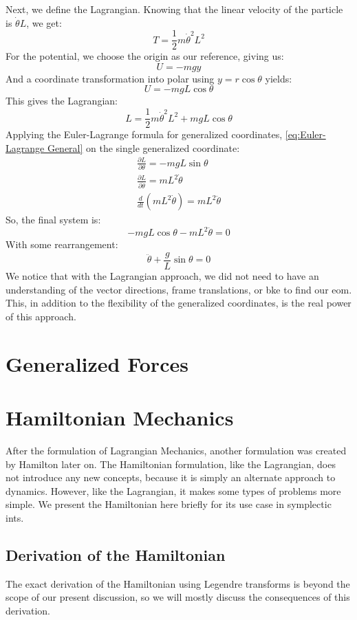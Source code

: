 \documentclass[12pt]{report}
\begin{document}
Next, we define the \gls{Lagrangian}. Knowing that the linear velocity of the particle is $\dot{\theta}L$, we get:
$$T=\frac{1}{2}m\dot{\theta}^2L^2$$
For the potential, we choose the origin as our reference, giving us:
$$U=-mgy$$
And a coordinate transformation into polar using $y=r\cos\theta$ yields:
$$U=-mgL\cos\theta$$
This gives the \gls{Lagrangian}:
$$L=\frac{1}{2}m\dot{\theta}^2L^2+mgL\cos\theta$$
Applying the Euler-Lagrange formula for generalized coordinates, \eqref{eq:Euler-Lagrange General} on the single generalized coordinate:
\begin{gather}
    \frac{\partial L}{\partial \theta}=-mgL\sin\theta\\
    \frac{\partial L}{\partial \dot{\theta}}=mL^2\dot{\theta}\\
    \frac{d}{dt}\left(mL^2\dot{\theta}\right)=mL^2\ddot{\theta}
\end{gather}
So, the final system is:
$$-mgL\cos\theta -mL^2\ddot{\theta}=0$$
With some rearrangement:
$$\ddot{\theta}+\frac{g}{L}\sin\theta=0$$
We notice that with the \gls{Lagrangian} approach, we did not need to have an understanding of the vector directions, frame translations, or \gls{bke} to find our \gls{eom}. This, in addition to the flexibility of the generalized coordinates, is the real power of this approach.

\section{Generalized Forces}

\section{Hamiltonian Mechanics}
After the formulation of \gls{Lagrangian} Mechanics, another formulation was created by Hamilton later on. The Hamiltonian formulation, like the \gls{Lagrangian}, does not introduce any new concepts, because it is simply an alternate approach to dynamics. However, like the \gls{Lagrangian}, it makes some types of problems more simple. We present the Hamiltonian here briefly for its use case in \glspl{symplectic int}.
\subsection{Derivation of the Hamiltonian}
The exact derivation of the Hamiltonian using Legendre transforms is beyond the scope of our present discussion, so we will mostly discuss the consequences of this derivation. 
\end{document}
